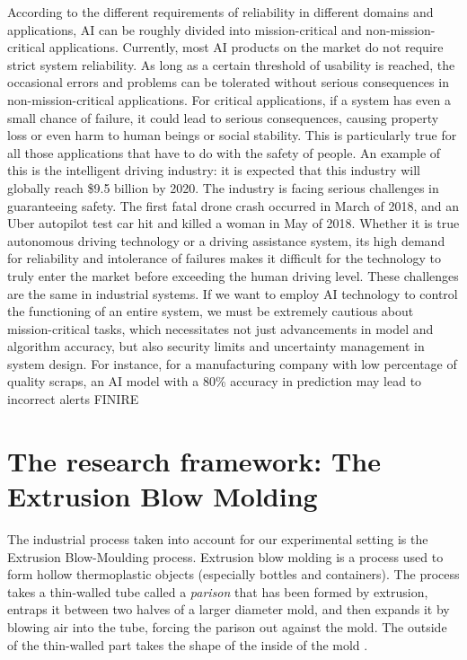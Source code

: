According to the different requirements of reliability in different domains and applications, AI can be roughly divided into mission-critical and non-mission-critical applications. Currently, most AI products on the market do not require strict system reliability. As long as a certain threshold of usability is reached, the occasional errors and problems can be tolerated without serious consequences in non-mission-critical applications. For critical applications, if a system has even a small chance of failure, it could lead to serious consequences, causing property loss or even harm to human beings or social stability. This is particularly true for all those applications that have to do with the safety of people. An example of this is the intelligent driving industry: it is expected
that this industry will globally reach \$9.5 billion by 2020. The industry is facing serious challenges in guaranteeing safety. The first fatal drone crash occurred in March of 2018, and an Uber autopilot test car hit and killed a woman in May of 2018. Whether it is true autonomous driving technology or a driving assistance system, its high demand for reliability and intolerance of failures makes it difficult for the technology to truly enter the market before exceeding the human driving level. These challenges are the same in industrial systems. If we want to employ AI technology to control the functioning of an entire system, we must be extremely cautious about mission-critical tasks, which necessitates not just advancements in model and algorithm accuracy, but also security limits and uncertainty management in system design. For instance, for a manufacturing company with low percentage of quality scraps, an AI model with a 80\% accuracy in prediction may lead to incorrect alerts FINIRE 


\section{The research framework: The Extrusion Blow Molding}


The industrial process taken into account for our experimental setting is the Extrusion Blow-Moulding process. Extrusion blow molding is a process used to form hollow thermoplastic objects (especially bottles and containers). The process takes a thin-walled tube called a \textit{parison} that has been formed by extrusion, entraps it between two halves of a larger diameter mold, and then expands it by blowing air into the tube, forcing the parison out against the mold. The outside of the thin-walled part takes the shape of the inside of the mold \citep{poli2001design}.

